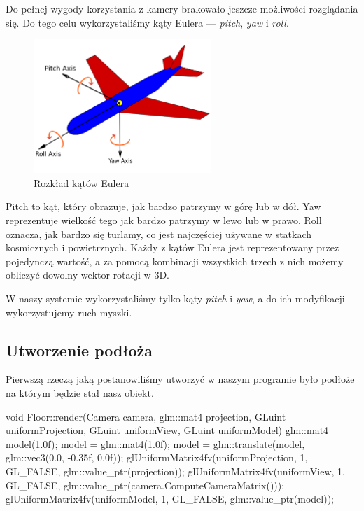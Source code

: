 \documentclass[a4paper,12pt]{article}
\numberwithin{equation}{section}
\begin{document}
Do pełnej wygody korzystania z kamery brakowało jeszcze możliwości rozglądania się. Do tego celu wykorzystaliśmy kąty Eulera — \textit{pitch}, \textit{yaw} i \textit{roll}. 
\begin{figure}[H]
    \centering
    \includegraphics[width=0.6\textwidth]{euler_axes.png}
    \caption{Rozkład kątów Eulera}
    \label{fig:axes}
\end{figure}

Pitch to kąt, który obrazuje, jak bardzo patrzymy w górę lub w dół. Yaw reprezentuje wielkość tego jak bardzo patrzymy w lewo lub w prawo. Roll oznacza, jak bardzo się turlamy, co jest najczęściej używane w statkach kosmicznych i powietrznych. Każdy z kątów Eulera jest reprezentowany przez pojedynczą wartość, a za pomocą kombinacji wszystkich trzech z nich możemy obliczyć dowolny wektor rotacji w 3D.

W naszy systemie wykorzystaliśmy tylko kąty \textit{pitch} i \textit{yaw}, a do ich modyfikacji wykorzystujemy ruch myszki.


\subsection{Utworzenie podłoża}
Pierwszą rzeczą jaką postanowiliśmy utworzyć w naszym programie było podłoże na którym będzie stał nasz obiekt. 
\begin{cppcode}

void Floor::render(Camera camera, glm::mat4 projection, GLuint uniformProjection, GLuint uniformView, GLuint uniformModel)
{
	glm::mat4 model(1.0f);
	model = glm::mat4(1.0f);
	model = glm::translate(model, glm::vec3(0.0, -0.35f, 0.0f));
	glUniformMatrix4fv(uniformProjection, 1, GL_FALSE, glm::value_ptr(projection));
	glUniformMatrix4fv(uniformView, 1, GL_FALSE, glm::value_ptr(camera.ComputeCameraMatrix()));
	glUniformMatrix4fv(uniformModel, 1, GL_FALSE, glm::value_ptr(model));
}
\end{cppcode}
\end{document}
